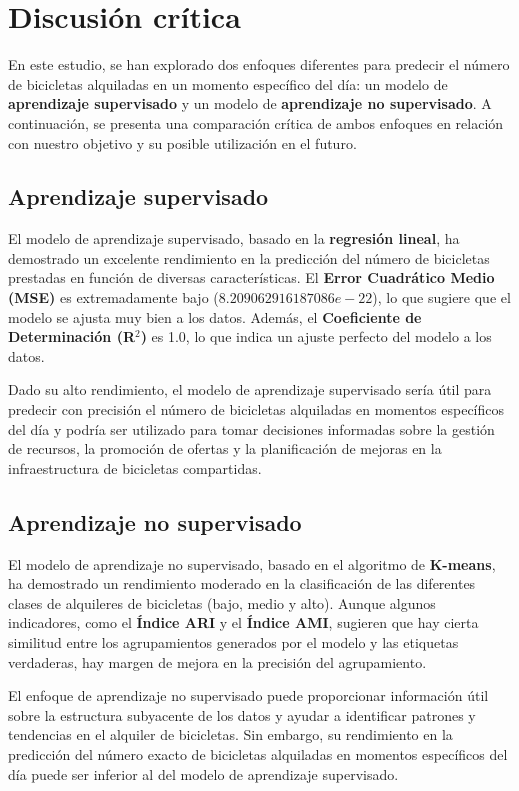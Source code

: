 \documentclass{wsdcr}
\begin{document}
\section{Discusión crítica}

En este estudio, se han explorado dos enfoques diferentes para predecir el número de bicicletas alquiladas en un momento específico del día: un modelo de \textbf{aprendizaje supervisado} y un modelo de \textbf{aprendizaje no supervisado}. A continuación, se presenta una comparación crítica de ambos enfoques en relación con nuestro objetivo y su posible utilización en el futuro.

\subsection{Aprendizaje supervisado}

El modelo de aprendizaje supervisado, basado en la \textbf{regresión lineal}, ha demostrado un excelente rendimiento en la predicción del número de bicicletas prestadas en función de diversas características. El \textbf{Error Cuadrático Medio (MSE)} es extremadamente bajo ($8.209062916187086e-22$), lo que sugiere que el modelo se ajusta muy bien a los datos. Además, el \textbf{Coeficiente de Determinación (R$^2$)} es 1.0, lo que indica un ajuste perfecto del modelo a los datos.

Dado su alto rendimiento, el modelo de aprendizaje supervisado sería útil para predecir con precisión el número de bicicletas alquiladas en momentos específicos del día y podría ser utilizado para tomar decisiones informadas sobre la gestión de recursos, la promoción de ofertas y la planificación de mejoras en la infraestructura de bicicletas compartidas.

\subsection{Aprendizaje no supervisado}

El modelo de aprendizaje no supervisado, basado en el algoritmo de \textbf{K-means}, ha demostrado un rendimiento moderado en la clasificación de las diferentes clases de alquileres de bicicletas (bajo, medio y alto). Aunque algunos indicadores, como el \textbf{Índice ARI} y el \textbf{Índice AMI}, sugieren que hay cierta similitud entre los agrupamientos generados por el modelo y las etiquetas verdaderas, hay margen de mejora en la precisión del agrupamiento.

El enfoque de aprendizaje no supervisado puede proporcionar información útil sobre la estructura subyacente de los datos y ayudar a identificar patrones y tendencias en el alquiler de bicicletas. Sin embargo, su rendimiento en la predicción del número exacto de bicicletas alquiladas en momentos específicos del día puede ser inferior al del modelo de aprendizaje supervisado.
\end{document}
